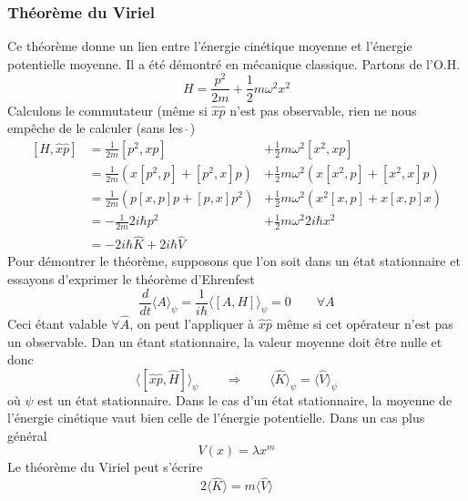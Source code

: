 		\subsubsection{Théorème du Viriel}
		Ce théorème donne un lien entre l'énergie cinétique moyenne et l'énergie potentielle moyenne. Il 
		a été démontré en mécanique classique. Partons de l'O.H.
		\begin{equation}
		H = \frac{p^2}{2m}+\frac{1}{2}m\omega^2x^2
		\end{equation}
		Calculons le commutateur (même si $\hat{x}\hat{p}$ n'est pas observable, rien ne nous empêche de 
		le calculer (sans les $\hat{\ }$)
		\begin{equation}
		\begin{array}{lll}
		[H,\hat{x}\hat{p}] &= \frac{1}{2m}[p^2,xp] &+ \frac{1}{2}m\omega^2[x^2,xp]\\
		&=\frac{1}{2m}(x[p^2,p]+[p^2,x]p) &+ \frac{1}{2}m\omega^2(x[x^2,p]+[x^2,x]p)\\
		&=\frac{1}{2m}(p[x,p]p + [p,x]p^2) &+ \frac{1}{2}m\omega^2(x^2[x,p]+x[x,p]x)\\
		&=-\frac{1}{2m}2i\hbar p^2 &+ \frac{1}{2}m\omega^2 2i\hbar x^2\\		
		&= -2i\hbar\hat{K}+2i\hbar\hat{V}
		\end{array}
		\end{equation}
		Pour démontrer le théorème, supposons que l'on soit dans un état stationnaire et essayons d'exprimer 
		le théorème d'Ehrenfest
		\begin{equation}
		\dfrac{d}{dt}\langle A\rangle_\psi = \frac{1}{i\hbar}\langle[A,H]\rangle_\psi = 0\qquad \forall A
		\end{equation}
		Ceci étant valable $\forall \hat{A}$, on peut l'appliquer à $\hat{x}\hat{p}$ même si cet opérateur 
		n'est pas un observable. Dan un étant stationnaire, la valeur moyenne doit être nulle et donc
		\begin{equation}
		\langle[\hat{x}\hat{p},\hat{H}]\rangle_\psi\qquad\Longrightarrow\qquad \langle \hat{K}\rangle_\psi =
		\langle \hat{V}\rangle_\psi 
		\end{equation}
		où $\psi$ est un état stationnaire. Dans le cas d'un état stationnaire, la moyenne de l'énergie 
		cinétique vaut bien celle de l'énergie potentielle. Dans un cas plus	général	
		\begin{equation}
		V(x) = \lambda x^m
		\end{equation}
		Le théorème du Viriel peut s'écrire
		\begin{equation}
		2\langle\hat{K}\rangle = m\langle\hat{V}\rangle
		\end{equation}
	




